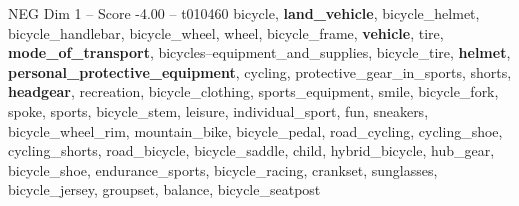 \begin{textsample}{NEG Dim 1 – Score -4.00 – t010460}  \label{ex:f1_neg_016}
bicycle, \textbf{land\_vehicle}, bicycle\_helmet, bicycle\_handlebar, bicycle\_wheel, wheel, bicycle\_frame, \textbf{vehicle}, tire, \textbf{mode\_of\_transport}, bicycles--equipment\_and\_supplies, bicycle\_tire, \textbf{helmet}, \textbf{personal\_protective\_equipment}, cycling, protective\_gear\_in\_sports, shorts, \textbf{headgear}, recreation, bicycle\_clothing, sports\_equipment, smile, bicycle\_fork, spoke, sports, bicycle\_stem, leisure, individual\_sport, fun, sneakers, bicycle\_wheel\_rim, mountain\_bike, bicycle\_pedal, road\_cycling, cycling\_shoe, cycling\_shorts, road\_bicycle, bicycle\_saddle, child, hybrid\_bicycle, hub\_gear, bicycle\_shoe, endurance\_sports, bicycle\_racing, crankset, sunglasses, bicycle\_jersey, groupset, balance, bicycle\_seatpost

\end{textsample}
